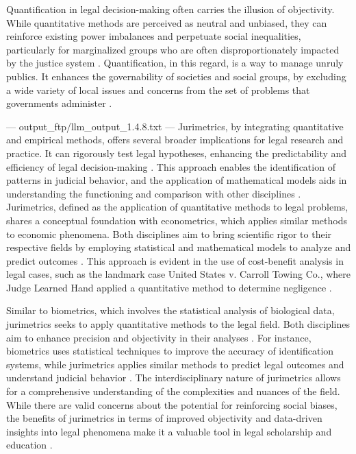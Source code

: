 Quantification in legal decision-making often carries the illusion of objectivity. While quantitative methods are perceived as neutral and unbiased, they can reinforce existing power imbalances and perpetuate social inequalities, particularly for marginalized groups who are often disproportionately impacted by the justice system \cite{10.1590/data.2022.65.3.267,10.3390/fi9040068}. Quantification, in this regard, is a way to manage unruly publics. It enhances the governability of societies and social groups, by excluding a wide variety of local issues and concerns from the set of problems that governments administer \cite{at2023}.


---
output_ftp/llm_output_1.4.8.txt
---
Jurimetrics, by integrating quantitative and empirical methods, offers several broader implications for legal research and practice. It can rigorously test legal hypotheses, enhancing the predictability and efficiency of legal decision-making \cite{nunes2018,de2010}. This approach enables the identification of patterns in judicial behavior, and the application of mathematical models aids in understanding the functioning and comparison with other disciplines \cite{ribeiro2021quantification,zabala2019d,silva2023role}. Jurimetrics, defined as the application of quantitative methods to legal problems, shares a conceptual foundation with econometrics, which applies similar methods to economic phenomena. Both disciplines aim to bring scientific rigor to their respective fields by employing statistical and mathematical models to analyze and predict outcomes \cite{ribeiro2021quantification}. This approach is evident in the use of cost-benefit analysis in legal cases, such as the landmark case United States v. Carroll Towing Co., where Judge Learned Hand applied a quantitative method to determine negligence \cite{zabala2019d}.

Similar to biometrics, which involves the statistical analysis of biological data, jurimetrics seeks to apply quantitative methods to the legal field. Both disciplines aim to enhance precision and objectivity in their analyses \cite{10.1590/data.2022.65.3.267,loevinger1959}. For instance, biometrics uses statistical techniques to improve the accuracy of identification systems, while jurimetrics applies similar methods to predict legal outcomes and understand judicial behavior \cite{10.1590/data.2022.65.3.267,loevinger1959}. The interdisciplinary nature of jurimetrics allows for a comprehensive understanding of the complexities and nuances of the field. While there are valid concerns about the potential for reinforcing social biases, the benefits of jurimetrics in terms of improved objectivity and data-driven insights into legal phenomena make it a valuable tool in legal scholarship and education \cite{10.1590/data.2022.65.3.267,loevinger1959}.

